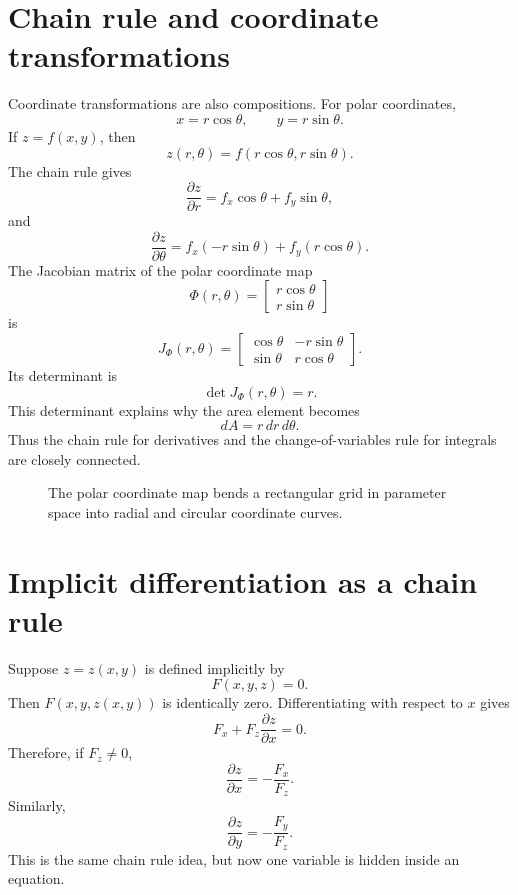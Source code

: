 \documentclass[11pt]{article}
\newcommand{\bmat}[1]{\begin{bmatrix}#1\end{bmatrix}}
\begin{document}
\section{Chain rule and coordinate transformations}

Coordinate transformations are also compositions. For polar coordinates,
\[
x=r\cos\theta,\qquad y=r\sin\theta.
\]
If $z=f(x,y)$, then
\[
z(r,\theta)=f(r\cos\theta,r\sin\theta).
\]
The chain rule gives
\[
\frac{\partial z}{\partial r}=f_x\cos\theta+f_y\sin\theta,
\]
and
\[
\frac{\partial z}{\partial \theta}=f_x(-r\sin\theta)+f_y(r\cos\theta).
\]
The Jacobian matrix of the polar coordinate map
\[
\Phi(r,\theta)=\bmat{r\cos\theta\\r\sin\theta}
\]
is
\[
J_\Phi(r,\theta)=\begin{bmatrix}\cos\theta&-r\sin\theta\\ \sin\theta&r\cos\theta\end{bmatrix}.
\]
Its determinant is
\[
\det J_\Phi(r,\theta)=r.
\]
This determinant explains why the area element becomes
\[
dA=r\,dr\,d\theta.
\]
Thus the chain rule for derivatives and the change-of-variables rule for integrals are closely connected.

\begin{figure}[H]
\centering
{}
\caption{The polar coordinate map bends a rectangular grid in parameter space into radial and circular coordinate curves.}
\end{figure}

\section{Implicit differentiation as a chain rule}

Suppose $z=z(x,y)$ is defined implicitly by
\[
F(x,y,z)=0.
\]
Then $F(x,y,z(x,y))$ is identically zero. Differentiating with respect to $x$ gives
\[
F_x+F_z\frac{\partial z}{\partial x}=0.
\]
Therefore, if $F_z\ne 0$,
\[
\boxed{\frac{\partial z}{\partial x}=-\frac{F_x}{F_z}}.
\]
Similarly,
\[
\boxed{\frac{\partial z}{\partial y}=-\frac{F_y}{F_z}}.
\]
This is the same chain rule idea, but now one variable is hidden inside an equation.
\end{document}
